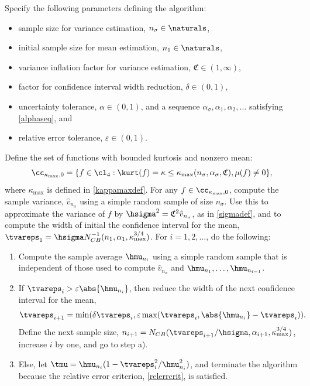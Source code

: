 \documentclass[graybox]{svmult}
\newcommand{\hv}{\hat{v}}
\newcommand{\fudge}{\mathfrak{C}}
\begin{document}
\begin{theorem} \label{relerradaptthm} Specify the following parameters defining the algorithm:
\begin{itemize}
\item sample size for variance estimation, $n_{\sigma} \in \naturals$,
\item initial sample size for mean estimation, $n_1 \in \naturals$,
\item variance inflation factor for variance estimation, $\fudge \in (1,\infty)$, 
\item factor for confidence interval width reduction, $\delta \in (0,1)$,
\item uncertainty tolerance, $\alpha\in (0,1)$, and a sequence $\alpha_{\sigma}, \alpha_1,  \alpha_2, \ldots$ satisfying \eqref{alphaseq}, and
\item relative error tolerance, $\varepsilon \in (0,1)$. 
\end{itemize} 
Define the set of functions with bounded kurtosis and nonzero mean:
\[
\cc_{\kappa_{\max},0}= \{f \in \cl_{4} : \kurt(f)= \kappa \le \kappa_{\max}(n_{\sigma},\alpha_{\sigma},\fudge), \mu(f) \ne 0\},
\]
where $\kappa_{\max}$ is defined in \eqref{kappamaxdef}.  For any $f \in \cc_{\kappa_{\max},0}$, compute the sample variance, $\hv_{n_{\sigma}}$ using a simple random sample of size $n_{\sigma}$. Use this to approximate the variance of $f$ by $\hsigma^2 = \fudge^2 \hv_{n_{\sigma}}$, as in \eqref{sigmadef}, and to compute the width of initial the confidence interval for the mean, $\tvareps_1=\hsigma N_{CB}^{-1}(n_1,\alpha_1,\kappa_{\max}^{3/4})$.  For $i=1, 2, \ldots$, do the following:
\begin{enumerate}
\renewcommand{\labelenumi}{\alph{enumi})}
\item Compute the sample average $\hmu_{n_i}$ using a simple random sample that is independent of those used to compute $\hv_{n_{\sigma}}$ and $\hmu_{n_1}, \ldots, \hmu_{n_{i-1}}$.

\item If $\tvareps_i > \varepsilon \abs{\hmu_{n_i}}$, then reduce the width of the next confidence interval for the mean, 
\[
\tvareps_{i+1} = \min(\delta\tvareps_i, \varepsilon \max(\tvareps_i,\abs{\hmu_{n_i}}-\tvareps_i)).
\]
Define the next sample size, $n_{i+1} = N_{CB}(\tvareps_{i+1}/\hsigma,\alpha_{i+1},\kappa_{\max}^{3/4})$,
increase $i$ by one, and go to step a). 

\item Else, let $\tmu = \hmu_{n_i}(1 - \tvareps_i^2/\hmu_{n_i}^2)$, and terminate the algorithm because the relative error criterion, \eqref{relerrcrit}, is satisfied.

\end{enumerate}
\end{theorem}
\end{document}
